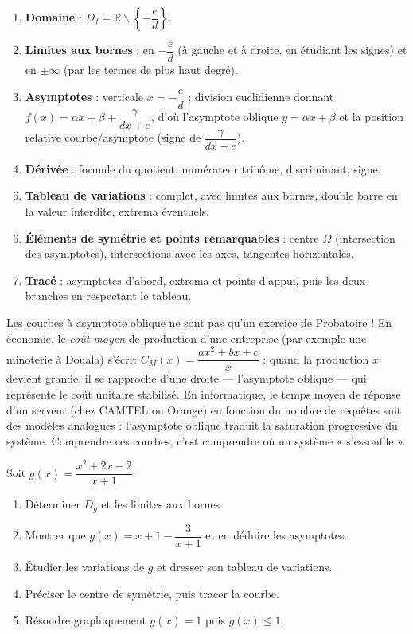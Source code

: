 \documentclass[11pt]{article}
\def\setminus{\mathbin{\backslash}}\let\smallsetminus\setminus
\begin{document}
\begin{methode}[Plan d'étude complet en 7 étapes de $f(x) = \dfrac{ax^2+bx+c}{dx+e}$]
\begin{enumerate}
\item \textbf{Domaine} : $D_f = \mathbb{R} \setminus \left\{-\dfrac{e}{d}\right\}$.
\item \textbf{Limites aux bornes} : en $-\dfrac{e}{d}$ (à gauche et à droite, en étudiant les signes) et en $\pm\infty$ (par les termes de plus haut degré).
\item \textbf{Asymptotes} : verticale $x = -\dfrac{e}{d}$ ; division euclidienne donnant $f(x) = \alpha x + \beta + \dfrac{\gamma}{dx+e}$, d'où l'asymptote oblique $y = \alpha x + \beta$ et la position relative courbe/asymptote (signe de $\dfrac{\gamma}{dx+e}$).
\item \textbf{Dérivée} : formule du quotient, numérateur trinôme, discriminant, signe.
\item \textbf{Tableau de variations} : complet, avec limites aux bornes, double barre en la valeur interdite, extrema éventuels.
\item \textbf{Éléments de symétrie et points remarquables} : centre $\Omega$ (intersection des asymptotes), intersections avec les axes, tangentes horizontales.
\item \textbf{Tracé} : asymptotes d'abord, extrema et points d'appui, puis les deux branches en respectant le tableau.
\end{enumerate}
\end{methode}

\begin{savaistu}
Les courbes à asymptote oblique ne sont pas qu'un exercice de Probatoire ! En économie, le \emph{coût moyen} de production d'une entreprise (par exemple une minoterie à Douala) s'écrit $C_M(x) = \dfrac{ax^2+bx+c}{x}$ : quand la production $x$ devient grande, il se rapproche d'une droite — l'asymptote oblique — qui représente le coût unitaire stabilisé. En informatique, le temps moyen de réponse d'un serveur (chez CAMTEL ou Orange) en fonction du nombre de requêtes suit des modèles analogues : l'asymptote oblique traduit la saturation progressive du système. Comprendre ces courbes, c'est comprendre où un système « s'essouffle ».
\end{savaistu}

\begin{exercice}
Soit $g(x) = \dfrac{x^2 + 2x - 2}{x + 1}$.
\begin{enumerate}
\item Déterminer $D_g$ et les limites aux bornes.
\item Montrer que $g(x) = x + 1 - \dfrac{3}{x+1}$ et en déduire les asymptotes.
\item Étudier les variations de $g$ et dresser son tableau de variations.
\item Préciser le centre de symétrie, puis tracer la courbe.
\item Résoudre graphiquement $g(x) = 1$ puis $g(x) \leq 1$.
\end{enumerate}
\end{exercice}
\end{document}
